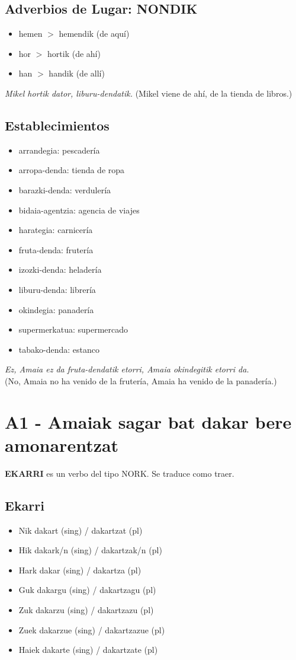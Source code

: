 \documentclass[11pt, a4paper]{article}
\begin{document}
\subsection{Adverbios de Lugar: NONDIK}
\begin{itemize}
\item hemen $>$ hemendik (de aquí)
\item hor $>$ hortik (de ahí)
\item han $>$ handik (de allí)
\end{itemize}
\indent \indent \textit{Mikel hortik dator, liburu-dendatik.} (Mikel viene de ahí, de la tienda de libros.)

\subsection{Establecimientos}
\begin{multicols}{2}
\begin{itemize}
\item arrandegia: pescadería
\item arropa-denda: tienda de ropa
\item barazki-denda: verdulería
\item bidaia-agentzia: agencia de viajes
\item harategia: carnicería
\item fruta-denda: frutería
\item izozki-denda: heladería
\item liburu-denda: librería
\item okindegia: panadería
\item supermerkatua: supermercado
\item tabako-denda: estanco
\end{itemize}
\end{multicols}
\indent \textit{Ez, Amaia ez da fruta-dendatik etorri, Amaia okindegitik etorri da.}\\
\indent (No, Amaia no ha venido de la frutería, Amaia ha venido de la panadería.)

\section{A1 - Amaiak sagar bat dakar bere amonarentzat}
\textbf{EKARRI} es un verbo del tipo NORK. Se traduce como traer.

\subsection{Ekarri}
\begin{itemize}
\item Nik dakart (sing) / dakartzat (pl)
\item Hik dakark/n (sing) / dakartzak/n (pl)
\item Hark dakar (sing) / dakartza (pl)
\item Guk dakargu (sing) / dakartzagu (pl)
\item Zuk dakarzu (sing) / dakartzazu (pl)
\item Zuek dakarzue (sing) / dakartzazue (pl)
\item Haiek dakarte (sing) / dakartzate (pl)
\end{itemize}
\end{document}
